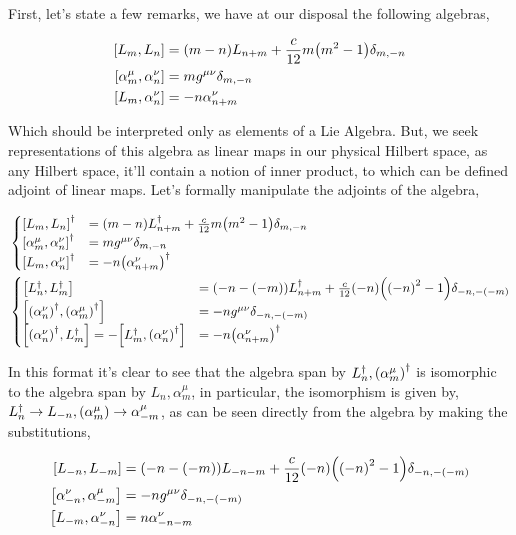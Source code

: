 \problem{}
\probitem{}

First, let's state a few remarks, we have at our disposal the following algebras,

\begin{align*}
    \comm{L_m}{L_n}&=\qty(m-n)L_{n+m}+\frac{c}{12}m\qty(m^2-1)\delta_{m,-n}\\
    \comm{\alpha^\mu_m}{\alpha^\nu_n}&=mg^{\mu\nu}\delta_{m,-n}\\
    \comm{L_m}{\alpha^\nu_n}&=-n\alpha^\nu_{n+m}
\end{align*}

Which should be interpreted only as elements of a Lie Algebra. But, we seek representations of this algebra as linear 
maps in our physical Hilbert space, as any Hilbert space, it'll contain a notion of inner product, to which can be defined 
adjoint of linear maps. Let's formally manipulate the adjoints of the algebra,

\begin{align*}
    &\begin{cases}
        \comm{L_m}{L_n}^\dagger&=\qty(m-n)L^\dagger_{n+m}+\frac{c}{12}m\qty(m^2-1)\delta_{m,-n}\\
        \comm{\alpha^\mu_m}{\alpha^\nu_n}^\dagger&=mg^{\mu\nu}\delta_{m,-n}\\
        \comm{L_m}{\alpha^\nu_n}^\dagger&=-n\qty(\alpha^\nu_{n+m})^\dagger
    \end{cases}\\
    &\begin{cases}
        \comm{L^\dagger_n}{L^\dagger_m}&=\qty(-n-\qty(-m))L^\dagger_{n+m}+\frac{c}{12}\qty(-n)\qty(\qty(-n)^2-1)\delta_{-n,-\qty(-m)}\\
        \comm{\qty(\alpha^\nu_n)^\dagger}{\qty(\alpha^\mu_m)^\dagger}&=-ng^{\mu\nu}\delta_{-n,-\qty(-m)}\\
        \comm{\qty(\alpha^\nu_n)^\dagger}{L^\dagger_m}=-\comm{L^\dagger_m}{\qty(\alpha^\nu_n)^\dagger}&=-n\qty(\alpha^\nu_{n+m})^\dagger
    \end{cases}
\end{align*}

In this format it's clear to see that the algebra span by $L^\dagger_n,\qty(\alpha_m^\mu)^\dagger$ is isomorphic to the algebra span by $L_n,\alpha_m^\mu$, 
in particular, the isomorphism is given by, $L^\dagger_n\rightarrow L_{-n},\qty(\alpha^\mu_m)\rightarrow\alpha^\mu_{-m}$, as can be seen directly from 
the algebra by making the substitutions,

\begin{align*}
    \comm{L_{-n}}{L_{-m}}&=\qty(-n-\qty(-m))L_{-n-m}+\frac{c}{12}\qty(-n)\qty(\qty(-n)^2-1)\delta_{-n,-\qty(-m)}\\
    \comm{\alpha^\nu_{-n}}{\alpha^\mu_{-m}}&=-ng^{\mu\nu}\delta_{-n,-\qty(-m)}\\
    \comm{L_{-m}}{\alpha^\nu_{-n}}&=n\alpha^\nu_{-n-m}
\end{align*}

